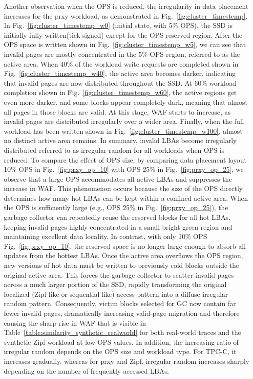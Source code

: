 \documentclass{ieeeaccess}
\begin{document}
Another observation when the OPS is reduced, the irregularity in data placement increases for the prxy workload, as demonstrated in Fig.~\ref{fig:cluster_timestemp}. In Fig.~\ref{fig:cluster_timestemp_w0} (initial state, with 5\% OPS), the SSD is initially fully written(tick signed) except for the OPS-reserved region. After the OPS space is written shown in Fig.~\ref{fig:cluster_timestemp_w5}, we can see that invalid pages are mostly concentrated in the 5\% OPS region, referred to as the active area.
When 40\% of the workload write requests are completed shown in Fig.~\ref{fig:cluster_timestemp_w40}, the active area becomes darker, indicating that invalid pages are now distributed throughout the SSD. At 60\% workload completion shown in Fig.~\ref{fig:cluster_timestemp_w60}, the active regions get even more darker, and some blocks appear completely dark, meaning that almost all pages in those blocks are valid. At this stage, WAF starts to increase, as invalid pages are distributed irregularly over a wider area. Finally, when the full workload has been written shown in Fig.~\ref{fig:cluster_timestemp_w100}, almost no distinct active area remains. In summary, invalid LBAs become irregularly distributed referred to as irregular random for all workloads when OPS is reduced. To compare the effect of OPS size, by comparing data placement layout 10\% OPS in Fig.~\ref{fig:prxy_op_10} with OPS 25\% in Fig.~\ref{fig:prxy_op_25}, we observe that a large OPS accommodates all active LBAs and suppresses the increase in WAF. This phenomenon occurs because the size of the OPS directly determines how many hot LBAs can be kept within a confined active area.  
When the OPS is sufficiently large (e.g., OPS 25\% in Fig.~\ref{fig:prxy_op_25}), the garbage collector can repeatedly reuse the reserved blocks for all hot LBAs, keeping invalid pages highly concentrated in a small bright-green region and maintaining excellent data locality. In contrast, with only 10\% OPS Fig.~\ref{fig:prxy_op_10}, the reserved space is no longer large enough to absorb all updates from the hottest LBAs. Once the active area overflows the OPS region, new versions of hot data must be written to previously cold blocks outside the original active area.  
This forces the garbage collector to scatter invalid pages across a much larger portion of the SSD, rapidly transforming the original localized (Zipf-like or sequential-like) access pattern into a diffuse irregular random pattern.  
Consequently, victim blocks selected for GC now contain far fewer invalid pages, dramatically increasing valid-page migration and therefore causing the sharp rise in WAF that is visible in Table~\ref{table:similarity_synthetic_realworld} for both real-world traces and the synthetic Zipf workload at low OPS values. In addition, the increasing ratio of irregular random depends on the OPS size and workload type. For TPC-C, it increases gradually, whereas for prxy and Zipf, irregular random increases sharply depending on the number of frequently accessed LBAs.
\end{document}
